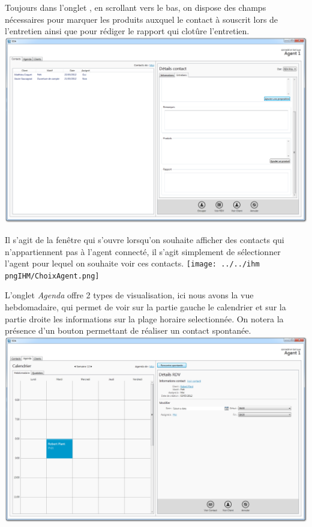 Toujours dans l'onglet , en scrollant vers le bas, on dispose des champs nécessaires pour marquer les produits auxquel le contact à souscrit lors de l'entretien ainsi que pour rédiger le rapport qui clotûre l'entretien.
\includegraphics[width=\textwidth]{../../ihm/pngIHM/ContactEntretiens2.png}

Il s'agit de la fenêtre qui s'ouvre lorsqu'on souhaite afficher des contacts qui n'appartiennent pas à l'agent connecté, il s'agit simplement de sélectionner l'agent pour lequel on souhaite voir ces contacts.
\texttt{[image: ../../ihm\\pngIHM/ChoixAgent.png]}

L'onglet \textit{Agenda} offre 2 types de visualisation, ici nous avons la vue hebdomadaire, qui permet de voir sur la partie gauche le calendrier et sur la partie droite les informations sur la plage horaire selectionnée.
On notera la présence d'un bouton permettant de réaliser un contact spontanée.
\includegraphics[width=\textwidth]{../../ihm/pngIHM/Calendrier Hebdomadaire.png}

